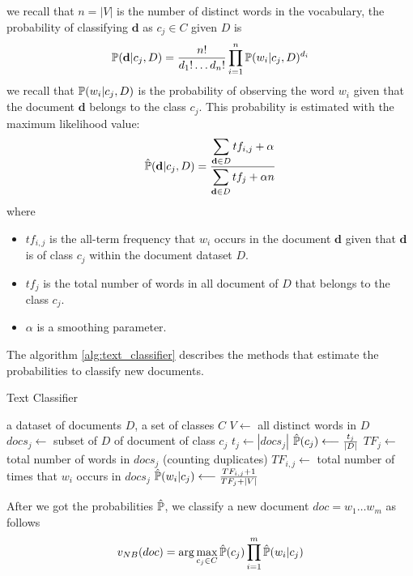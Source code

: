 \documentclass[10pt, letterpaper]{report}
\begin{document}
we recall that $n=|V|$ is the number of distinct words in the vocabulary, the probability of classifying $\mathbf d$ as $c_j\in C$ given $D$ is\begin{equation}
	{\mathbb P}(\mathbf d|c_j,D)=\frac{n!}{d_1!\dots d_n!}\prod_{i=1}^{n}{\mathbb P}(w_i|c_j,D)^{d_i}
\end{equation}
we recall that ${\mathbb P}(w_i|c_j,D)$ is the probability of observing the word $w_i$ given that the document $\mathbf d$ belongs to the class $c_j$.  This probability is estimated with the maximum likelihood value:\begin{equation}
	\hat{{\mathbb P}}(\mathbf d|c_j,D)=\frac{\displaystyle
		\sum_{\mathbf d \in D}tf_{i,j}+\alpha
	}{\displaystyle
		\sum_{\mathbf d \in D}tf_{j}+\alpha n
	}
\end{equation}
where\begin{itemize}
	\item $tf_{i,j}$ is the all-term frequency that $w_i$ occurs in the document $\mathbf d$ given that $\mathbf d$ is of class $c_j$ within the document dataset $D$.
	\item $tf_{j}$ is the total number of words in all document of $D$ that belongs to the class $c_j$.
	\item $\alpha$ is a smoothing parameter.
\end{itemize}
The algorithm \ref{alg:text_classifier} describes the methods that estimate the probabilities to classify new documents.\bigskip

\begin{algorithm}
	\caption{Text Classifier}\label{alg:text_classifier}
	\begin{algorithmic}
		\Require a dataset of documents $D$, a set of classes $C$
		\State $V\longleftarrow$ all distinct words in $D$
		\State $docs_j\longleftarrow$ subset of $D$ of document of class $c_j$
		\State $t_j\longleftarrow |docs_j|$
		\State $\hat{{\mathbb P}}(c_j)\longleftarrow \frac{t_j}{|D|}$
		\State $TF_j\longleftarrow$ total number of words in $docs_j$ (counting duplicates)
		\State $TF_{i,j}\longleftarrow$ total number of times that $w_i$ occurs in $docs_j$
		\State $\hat{{\mathbb P}}(w_i|c_j)\longleftarrow \frac{TF_{i,j}+1}{TF_j+|V|}$
		\EndFor
		\EndFor
	\end{algorithmic}
\end{algorithm}

After we got the probabilities $\hat{{\mathbb P}}$, we classify a new document $doc=w_1\dots w_{m}$ as follows\begin{equation}
	v_{NB}(doc)=\arg\max_{c_j\in C}\hat{{\mathbb P}}(c_j)\prod_{i=1}^{m}\hat{{\mathbb P}}(w_i|c_j)
\end{equation}
\end{document}
